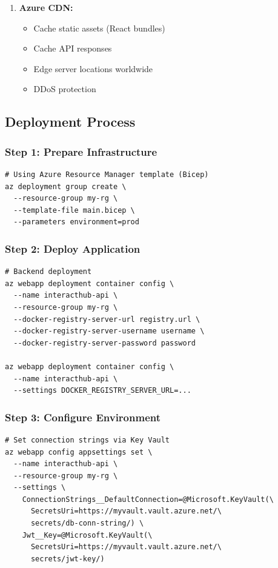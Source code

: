 \begin{enumerate}
    \item \textbf{Azure CDN:}
    \begin{itemize}
        \item Cache static assets (React bundles)
        \item Cache API responses
        \item Edge server locations worldwide
        \item DDoS protection
    \end{itemize}
\end{enumerate}

\subsection{Deployment Process}

\subsubsection{Step 1: Prepare Infrastructure}
\begin{verbatim}
# Using Azure Resource Manager template (Bicep)
az deployment group create \
  --resource-group my-rg \
  --template-file main.bicep \
  --parameters environment=prod
\end{verbatim}

\subsubsection{Step 2: Deploy Application}
\begin{verbatim}
# Backend deployment
az webapp deployment container config \
  --name interacthub-api \
  --resource-group my-rg \
  --docker-registry-server-url registry.url \
  --docker-registry-server-username username \
  --docker-registry-server-password password

az webapp deployment container config \
  --name interacthub-api \
  --settings DOCKER_REGISTRY_SERVER_URL=...
\end{verbatim}

\subsubsection{Step 3: Configure Environment}
\begin{verbatim}
# Set connection strings via Key Vault
az webapp config appsettings set \
  --name interacthub-api \
  --resource-group my-rg \
  --settings \
    ConnectionStrings__DefaultConnection=@Microsoft.KeyVault(\
      SecretsUri=https://myvault.vault.azure.net/\
      secrets/db-conn-string/) \
    Jwt__Key=@Microsoft.KeyVault(\
      SecretsUri=https://myvault.vault.azure.net/\
      secrets/jwt-key/)
\end{verbatim}

